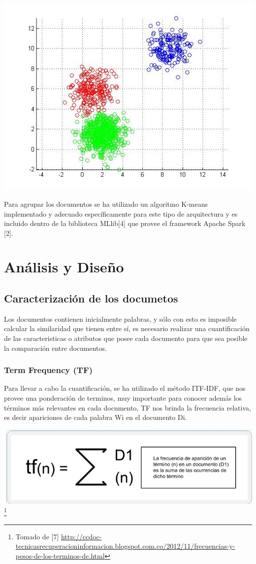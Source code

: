 \includegraphics[scale=0.4]{datos}

Para agrupar los documentos  se ha utilizado un algoritmo K-means implementado
y adecuado específicamente para este tipo de arquitectura y es incluido dentro de la
biblioteca MLlib[4] que provee el framework Apache Spark [2].


\section{Análisis y Diseño}

\subsection{Caracterización de los documetos}
Los documentos contienen inicialmente palabras, y sólo con esto es imposible
calcular la similaridad que tienen entre sí, es necesario realizar una
cuantificación de las caracteristicas o atributos que posee cada documento para
que sea posible la comparación entre documentos.

\subsubsection{Term Frequency (TF)}
Para llevar a cabo la cuantificación, se ha utilizado el método ITF-IDF, que nos
provee una ponderación de terminos, muy importante para conocer además los
términos más relevantes en cada documento, TF nos brinda la frecuencia relativa,
es decir apariciones de cada palabra Wi en el documento Di.

\includegraphics[scale=0.3]{tf_calculation}
\footnote{Tomado de [7]
\url{http://ccdoc-tecnicasrecuperacioninformacion.blogspot.com.co/2012/11/frecuencias-y-pesos-de-los-terminos-de.html}}


